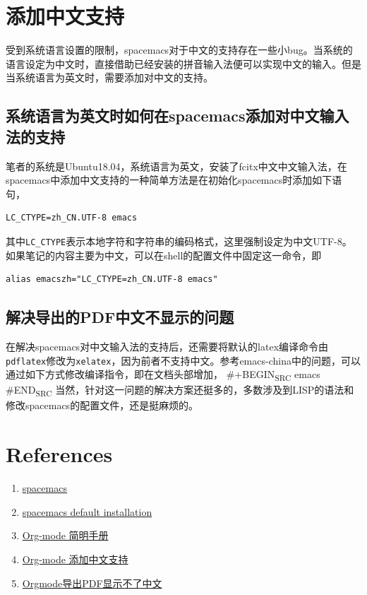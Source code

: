 \documentclass[11pt]{article}
\begin{document}
\section{添加中文支持}
\label{sec:org6e6ddcd}
受到系统语言设置的限制，spacemacs对于中文的支持存在一些小bug。当系统的语言设定为中文时，直接借助已经安装的拼音输入法便可以实现中文的输入。但是当系统语言为英文时，需要添加对中文的支持。

\subsection{系统语言为英文时如何在spacemacs添加对中文输入法的支持}
\label{sec:org9b5693a}
笔者的系统是Ubuntu18.04，系统语言为英文，安装了fcitx中文中文输入法，在spacemacs中添加中文支持的一种简单方法是在初始化spacemacs时添加如下语句，
\begin{verbatim}
LC_CTYPE=zh_CN.UTF-8 emacs
\end{verbatim}
其中\texttt{LC\_CTYPE}表示本地字符和字符串的编码格式，这里强制设定为中文UTF-8。如果笔记的内容主要为中文，可以在shell的配置文件中固定这一命令，即
\begin{verbatim}
alias emacszh="LC_CTYPE=zh_CN.UTF-8 emacs"
\end{verbatim}

\subsection{解决导出的PDF中文不显示的问题}
\label{sec:org082c310}
在解决spacemacs对中文输入法的支持后，还需要将默认的latex编译命令由\texttt{pdflatex}修改为\texttt{xelatex}，因为前者不支持中文。参考emacs-china中的问题，可以通过如下方式修改编译指令，即在文档头部增加，
\#+BEGIN\textsubscript{SRC} emacs
\#END\textsubscript{SRC}
当然，针对这一问题的解决方案还挺多的，多数涉及到LISP的语法和修改spacemacs的配置文件，还是挺麻烦的。

\section{References}
\label{sec:org131ec43}
\begin{enumerate}
\item \href{http://spacemacs.org/\#}{spacemacs}
\item \href{https://github.com/syl20bnr/spacemacs\#default-installation}{spacemacs default installation}
\item \href{https://www.cnblogs.com/Open\_Source/archive/2011/07/17/2108747.html}{Org-mode 简明手册}
\item \href{https://emacs-china.org/t/topic/4465}{Org-mode 添加中文支持}
\item \href{https://emacs-china.org/t/topic/2540}{Orgmode导出PDF显示不了中文}
\end{enumerate}
\end{document}
